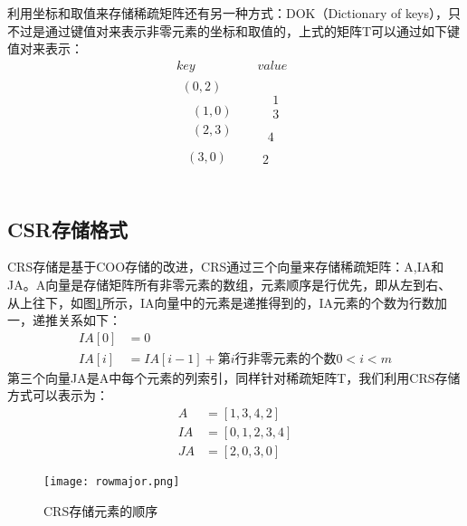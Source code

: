利用坐标和取值来存储稀疏矩阵还有另一种方式：DOK（Dictionary of keys），只不过是通过键值对来表示非零元素的坐标和取值的，上式的矩阵T可以通过如下键值对来表示：
\[\begin{matrix}
	key&		value\\
	\begin{array}{c}
	\left( 0,2 \right)\\
	\begin{array}{c}
	\begin{array}{c}
	\left( 1,0 \right)\\
	\left( 2,3 \right)\\
\end{array}\\
	\left( 3,0 \right)\\
\end{array}\\
\end{array}&		\begin{array}{c}
	\begin{array}{c}
	\begin{array}{c}
	1\\
	3\\
\end{array}\\
	4\\
\end{array}\\
	2\\
\end{array}\\
\end{matrix}\]

\subsection{CSR存储格式}

CRS存储是基于COO存储的改进，CRS通过三个向量来存储稀疏矩阵：A,IA和JA。A向量是存储矩阵所有非零元素的数组，元素顺序是行优先，即从左到右、从上往下，如图\ref{rowmajor}所示，IA向量中的元素是递推得到的，IA元素的个数为行数加一，递推关系如下：
\[
\begin{aligned}
IA\left[ 0 \right] &=0
\\
IA\left[ i \right] &=IA\left[ i-1 \right] +第i\text{行非零元素的个数} 0<i<m
\end{aligned}
\]
第三个向量JA是A中每个元素的列索引，同样针对稀疏矩阵T，我们利用CRS存储方式可以表示为：
\[
\begin{aligned}
A&=\left[ 1,3,4,2 \right] 
\\
IA&=\left[ 0,1,2,3,4 \right] 
\\
JA&=\left[ 2,0,3,0 \right] 
\end{aligned}
\]
\begin{figure}[h]
	\texttt{[image: rowmajor.png]}
	\caption{CRS存储元素的顺序}
	\label{rowmajor}
\end{figure}

